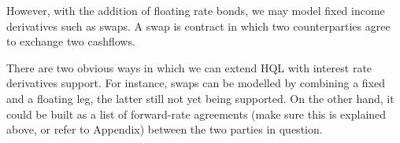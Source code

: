 However, with the addition of floating rate bonds, we may model fixed income 
derivatives such as swaps. A swap is contract in which two counterparties agree 
to exchange two cashflows.


There are two obvious ways in which we can extend HQL with interest rate 
derivatives support. For instance, swaps can be modelled by combining a fixed 
and a floating leg, the latter still not yet being supported. On the other 
hand, it could be built as a list of forward-rate agreements (make sure this is 
explained above, or refer to Appendix) between the two parties in question.
